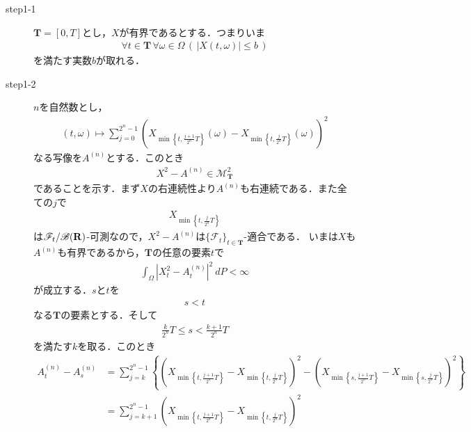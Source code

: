 	\begin{sketch}\mbox{}
		\begin{description}
			\item[step1-1] $\mathbf{T}=[0,T]$とし，$X$が有界であるとする．つまりいま
				\begin{align}
					\forall t \in \mathbf{T}\, \forall \omega \in \Omega\,
					\left(\, |X(t,\omega)| \leq b\, \right)
				\end{align}
				を満たす実数$b$が取れる．
			
			\item[step1-2] $n$を自然数とし，
				\begin{align}
					(t,\omega) \longmapsto \sum_{j=0}^{2^n-1} \left(X_{\min\left\{t,\frac{j+1}{2^n}T\right\}}(\omega)
					- X_{\min\left\{t,\frac{j}{2^n}T\right\}}(\omega)\right)^2
				\end{align}
				なる写像を$A^{(n)}$とする．このとき
				\begin{align}
					X^2 - A^{(n)} \in \mathscr{M}^2_{\mathbf{T}}
					\label{fom:thm_decomposition_of_local_martingales_2}
				\end{align}
				であることを示す．まず$X$の右連続性より$A^{(n)}$も右連続である．また全ての$j$で
				\begin{align}
					X_{\min\left\{t,\frac{j}{2^n}T\right\}}
				\end{align}
				は$\mathscr{F}_t/\mathscr{B}(\mathbf{R})$-可測なので，$X^2-A^{(n)}$は$\{\mathscr{F}_t\}_{t \in \mathbf{T}}$-適合である．
				いまは$X$も$A^{(n)}$も有界であるから，$\mathbf{T}$の任意の要素$t$で
				\begin{align}
					\int_{\Omega} \left|X_t^2-A_t^{(n)}\right|^2\ dP < \infty
				\end{align}
				が成立する．$s$と$t$を
				\begin{align}
					s < t
				\end{align}
				なる$\mathbf{T}$の要素とする．そして
				\begin{align}
					\frac{k}{2^n}T \leq s < \frac{k+1}{2^n}T
				\end{align}
				を満たす$k$を取る．このとき
				\begin{align}
					A^{(n)}_t - A^{(n)}_s
					&= \sum_{j=k}^{2^n-1} \left\{
					\left(X_{\min\left\{t,\frac{j+1}{2^n}T\right\}} - X_{\min\left\{t,\frac{j}{2^n}T\right\}}\right)^2
					- \left(X_{\min\left\{s,\frac{j+1}{2^n}T\right\}} - X_{\min\left\{s,\frac{j}{2^n}T\right\}}\right)^2\right\} \\
					&= \sum_{j=k+1}^{2^n-1} \left(X_{\min\left\{t,\frac{j+1}{2^n}T\right\}} - X_{\min\left\{t,\frac{j}{2^n}T\right\}}\right)^2

\end{align}
\end{description}
\end{sketch}
